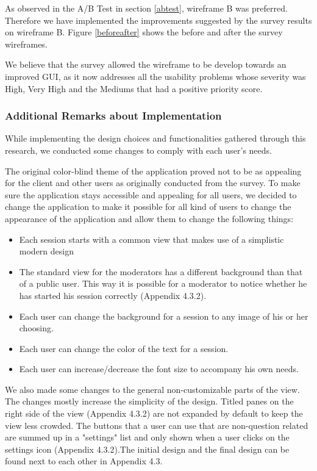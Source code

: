 \documentclass{article}
\begin{document}
As observed in the A/B Test in section \ref{abtest}, wireframe B was preferred. Therefore we have implemented the improvements
suggested by the survey results on wireframe B. Figure \ref{beforeafter} shows the before and after the survey wireframes.

We believe that the survey allowed the wireframe to be develop towards an improved GUI, as it now addresses all the usability problems whose severity
was High, Very High and the Mediums that had a positive priority score.

\subsubsection{Additional Remarks about Implementation\label{Implementation comments}}
While implementing the design choices and functionalities gathered through this research, we conducted some changes to comply with each user's needs.

The original color-blind theme of the application proved not to be as appealing for the client and other users as originally conducted from the survey. To make sure the application stays accessible and appealing for all users, we decided to change the application to make it possible for all kind of users to change the appearance of the application and allow them to change the following things:
\begin{itemize}
\item Each session starts with a common view that makes use of a simplistic modern design 
\item The standard view for the moderators has a different background than that of a public user. This way it is possible for a moderator to notice whether he has started his session correctly (Appendix 4.3.2).  
\item Each user can change the background for a session to any image of his or her choosing.
\item Each user can change the color of the text for a session.
\item Each user can increase/decrease the font size to accompany his own needs.
\end{itemize}
We also made some changes to the general non-customizable parts of the view.
The changes mostly increase the simplicity of the design.
Titled panes on the right side of the view (Appendix 4.3.2) are not expanded by default to keep the view less crowded.
The buttons that a user can use that are non-question related are summed up in a "settings" list and only shown when a user
clicks on the settings icon (Appendix 4.3.2).The initial design and the final design can be found next to each other
in Appendix 4.3.
\end{document}
